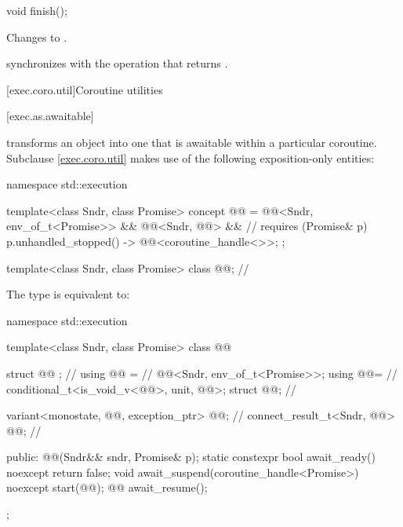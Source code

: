 %
\begin{itemdecl}
void finish();
\end{itemdecl}

\begin{itemdescr}
\pnum
\effects
Changes  to .

\pnum
\sync
{} synchronizes with the  operation
that returns .
\end{itemdescr}

[exec.coro.util]{Coroutine utilities}

[exec.as.awaitable]{}

\pnum
{} transforms an object into one
that is awaitable within a particular coroutine.
Subclause \ref{exec.coro.util} makes use of
the following exposition-only entities:
\begin{codeblock}
namespace std::execution {
  template<class Sndr, class Promise>
    concept @@ =
      @@<Sndr, env_of_t<Promise>> &&
      @@<Sndr, @@> &&    // \seebelow
      requires (Promise& p) {
        { p.unhandled_stopped() } -> @@<coroutine_handle<>>;
      };

  template<class Sndr, class Promise>
    class @@;                                     // \expos
}
\end{codeblock}

\pnum
The type  is equivalent to:

\begin{codeblock}
namespace std::execution {
  template<class Sndr, class Promise>
  class @@ {
    struct @@ {};                                             // \expos
    using @@ =                                          // \expos
      @@<Sndr, env_of_t<Promise>>;
    using @@=                                         // \expos
      conditional_t<is_void_v<@@>, unit, @@>;
    struct @@;                                  // \expos

    variant<monostate, @@, exception_ptr> @@{};    // \expos
    connect_result_t<Sndr, @@> @@;           // \expos

  public:
    @@(Sndr&& sndr, Promise& p);
    static constexpr bool await_ready() noexcept { return false; }
    void await_suspend(coroutine_handle<Promise>) noexcept { start(@@); }
    @@ await_resume();
  };
}
\end{codeblock}

